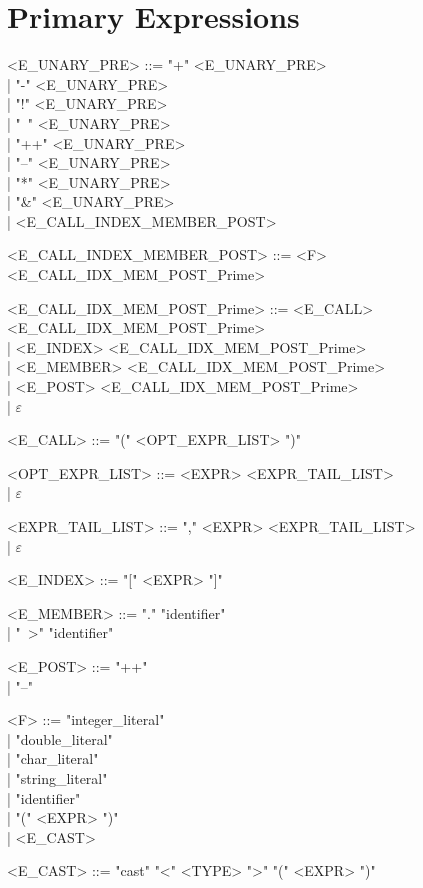 \section{Primary Expressions}
\begin{grammar}
      <E\_UNARY\_PRE> ::= "+" <E\_UNARY\_PRE> \\
      | "-" <E\_UNARY\_PRE> \\
      | "!" <E\_UNARY\_PRE> \\
      | "~" <E\_UNARY\_PRE> \\
      | "++" <E\_UNARY\_PRE> \\
      | "--" <E\_UNARY\_PRE> \\
      | "*" <E\_UNARY\_PRE> \\
      | "&" <E\_UNARY\_PRE> \\
      | <E\_CALL\_INDEX\_MEMBER\_POST>

      <E\_CALL\_INDEX\_MEMBER\_POST> ::= <F> <E\_CALL\_IDX\_MEM\_POST\_Prime>

      <E\_CALL\_IDX\_MEM\_POST\_Prime> ::= <E\_CALL> <E\_CALL\_IDX\_MEM\_POST\_Prime> \\
      | <E\_INDEX> <E\_CALL\_IDX\_MEM\_POST\_Prime> \\
      | <E\_MEMBER> <E\_CALL\_IDX\_MEM\_POST\_Prime> \\
      | <E\_POST> <E\_CALL\_IDX\_MEM\_POST\_Prime> \\
      | $\varepsilon$

      <E\_CALL> ::= "(" <OPT\_EXPR\_LIST> ")"

      <OPT\_EXPR\_LIST> ::= <EXPR> <EXPR\_TAIL\_LIST> \\
      | $\varepsilon$

      <EXPR\_TAIL\_LIST> ::= "," <EXPR> <EXPR\_TAIL\_LIST> \\
      | $\varepsilon$

      <E\_INDEX> ::= "[" <EXPR> "]"

      <E\_MEMBER> ::= "." "identifier" \\
      | "~>" "identifier"

      <E\_POST> ::= "++" \\
      | "--"

      <F> ::= "integer_literal" \\
      | "double_literal" \\
      | "char_literal" \\
      | "string_literal" \\
      | "identifier" \\
      | "(" <EXPR> ")" \\
      | <E\_CAST>

      <E\_CAST> ::= "cast" "<" <TYPE> ">" "(" <EXPR> ")"
\end{grammar}